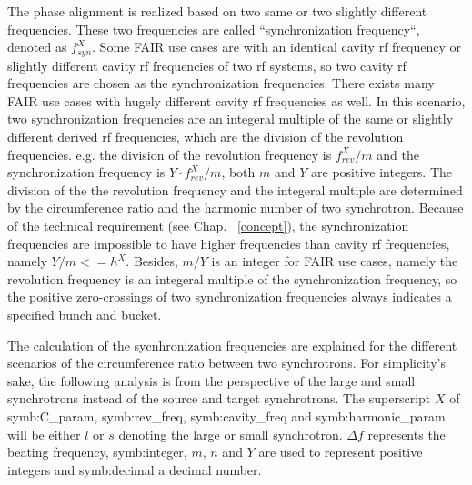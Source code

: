 The phase alignment is realized based on two same or two slightly different frequencies. These two frequencies are called ``synchronization frequency``, denoted as $f_\mathit{syn}^{X}$. Some FAIR use cases are with an identical cavity rf frequency or slightly different cavity rf frequencies of two rf systems, so two cavity rf frequencies are chosen as the synchronization frequencies. There exists many FAIR use cases with hugely different cavity rf frequencies as well. In this scenario, two synchronization frequencies are an integeral multiple of the same or slightly different derived rf frequencies, which are the division of the revolution frequencies. e.g. the division of the revolution frequency is $f_\mathit{rev}^{X}/m$ and the synchronization frequency is $Y\cdot f_\mathit{rev}^{X}/m$, both $m$ and $Y$ are positive integers. The division of the the revolution frequency and the integeral multiple are determined by the circumference ratio and the harmonic number of two synchrotron. Because of the technical requirement (see Chap. ~\ref{concept}), the synchronization frequencies are impossible to have higher frequencies than cavity rf frequencies, namely $Y/m <=h^X$. Besides, $m/Y$ is an integer for FAIR use cases, namely the revolution frequency is an integeral multiple of the synchronization frequency, so the positive zero-crossings of two synchronization frequencies always indicates a specified bunch and bucket.

The calculation of the sycnhronization frequencies are explained for the different scenarios of the circumference ratio between two synchrotrons. For simplicity's sake, the following analysis is from the perspective of the large and small synchrotrons instead of the source and target synchrotrons. The superscript $X$ of \gls{symb:C_param}, \gls{symb:rev_freq}, \gls{symb:cavity_freq} and \gls{symb:harmonic_param} will be either $l$ or $s$ denoting the large or small synchrotron. $\Delta f$ represents the beating frequency, \gls{symb:integer}, $m$, $n$ and $Y$ are used to represent positive integers and \gls{symb:decimal} a decimal number.

%
 


